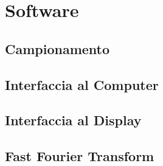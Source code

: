\chapter{Software}
\section{Campionamento}
\section{Interfaccia al Computer}
\section{Interfaccia al Display}
\section{Fast Fourier Transform}
